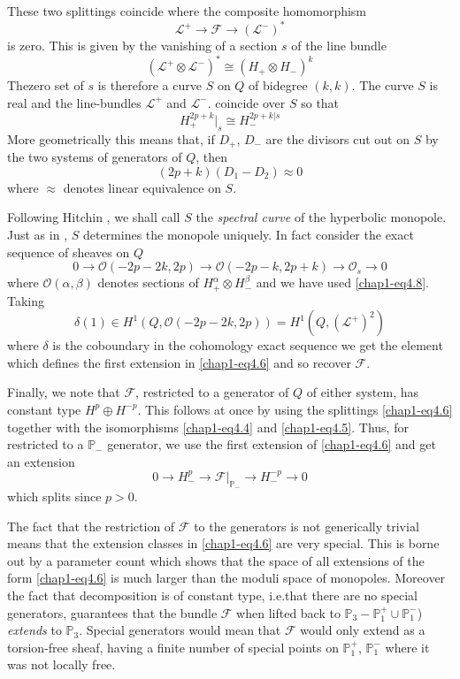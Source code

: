 These two splittings coincide where the composite homomorphism
$$
\mathscr{L}^{+}\to \mathscr{F}\to (\mathscr{L}^{-})^{*}
$$
is zero. This is given by the vanishing of a section $s$ of the line
bundle
\begin{equation}
(\mathscr{L}^{+}\otimes \mathscr{L}^{-})^{*}\cong (H_{+}\otimes
  H_{-})^{k}\label{chap1-eq4.7} 
\end{equation}
The\pageoriginale zero set of $s$ is therefore a curve $S$ on $Q$ of
bidegree $(k,k)$. The curve $S$ is real and the line-bundles
$\mathscr{L}^{+}$ and $\mathscr{L}^{-}$. coincide over $S$ so that
\begin{equation}
H^{2p+k}_{+}|_{s}\cong H^{2p+k|s}_{-}\label{chap1-eq4.8}
\end{equation}
More geometrically this means that, if $D_{+}$, $D_{-}$ are the
divisors cut out on $S$ by the two systems of generators of $Q$, then 
\begin{equation}
(2p+k)(D_{1}-D_{2})\approx 0\label{chap1-eq4.9}
\end{equation}
where $\approx$ denotes linear equivalence on $S$.

Following Hitchin \cite{chap1-key7}, we shall call $S$ the {\em
  spectral curve} of the hyperbolic monopole. Just as in
\cite{chap1-key7}, $S$ determines the monopole uniquely. In fact
consider the exact sequence of sheaves on $Q$
$$
0\to\mathscr{O}(-2p-2k,2p)\to \mathscr{O}(-2p-k,2p+k)\to
\mathscr{O}_{s}\to 0
$$
where $\mathscr{O}(\alpha,\beta)$ denotes sections of
$H^{\alpha}_{+}\otimes H^{\beta}_{-}$ and we have used
\eqref{chap1-eq4.8}. Taking
$$
\delta(1)\in H^{1}(Q,\mathscr{O}(-2p-2k,2p))=H^{1}(Q,(\mathscr{L}^{+})^{2})
$$
where $\delta$ is the coboundary in the cohomology exact sequence we
get the element which defines the first extension in \eqref{chap1-eq4.6}
and so recover $\mathscr{F}$. 

Finally, we note that $\mathscr{F}$, restricted to a generator of $Q$
of either system, has constant type $H^{p}\oplus H^{-p}$. This follows
at once by using the splittings \eqref{chap1-eq4.6} together with the
isomorphisms \eqref{chap1-eq4.4} and \eqref{chap1-eq4.5}. Thus, for
restricted to a $\mathbb{P}_{-}$ generator, we use the first extension
of \eqref{chap1-eq4.6} and get an extension 
$$
0\to H^{p}_{-}\to \mathscr{F}|_{\mathbb{P}_{-}}\to H^{-p}_{-}\to 0
$$\pageoriginale
which splits since $p>0$.

The fact that the restriction of $\mathscr{F}$ to the generators is
not generically trivial means that the extension classes in
\eqref{chap1-eq4.6} are very special. This is borne out by a parameter
count which shows that the space of all extensions of the form
\eqref{chap1-eq4.6} is much larger than the moduli space of
monopoles. Moreover the fact that decomposition is of constant type,
i.e.\@ that there are no special generators, guarantees that the
bundle $\mathscr{F}$ when lifted back to
$\mathbb{P}_{3}-\mathbb{P}^{+}_{1}\cup \mathbb{P}^{-}_{1}$) {\em
  extends} to $\mathbb{P}_{3}$. Special generators would mean that
$\mathscr{F}$ would only extend as a torsion-free sheaf, having a
finite number of special points on $\mathbb{P}^{+}_{1}$,
$\mathbb{P}^{-}_{1}$ where it was not locally free.

